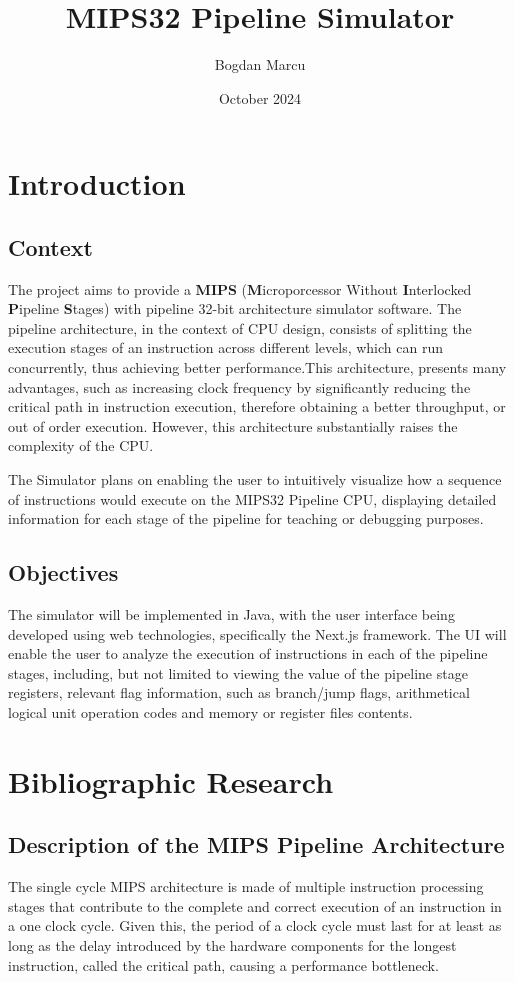 \documentclass{article}
\title{MIPS32 Pipeline Simulator}
\author{Bogdan Marcu}
\date{October 2024}
\begin{document}
\maketitle

\newpage

\tableofcontents

\newpage
\section{Introduction}
\subsection{Context}
The project aims to provide a \textbf{MIPS} (\textbf{M}icroporcessor Without \textbf{I}nterlocked \textbf{P}ipeline \textbf{S}tages) with pipeline 32-bit architecture simulator software. The pipeline architecture, in the context of CPU design, consists of splitting the execution stages of an instruction across different levels, which can run concurrently, thus achieving better performance.This architecture, presents many advantages, such as increasing clock frequency by significantly reducing the critical path in instruction execution, therefore obtaining a better throughput, or out of order execution. However, this architecture substantially raises the complexity of the CPU. 

The Simulator plans on enabling the user to intuitively visualize how a sequence of instructions would execute on the MIPS32 Pipeline CPU, displaying detailed information for each stage of the pipeline for teaching or debugging purposes.
\subsection{Objectives}
The simulator will be implemented in Java, with the user interface being developed using web technologies, specifically the Next.js framework. The UI will enable the user to analyze the execution of instructions in each of the pipeline stages, including, but not limited to viewing the value of the pipeline stage registers, relevant flag information, such as branch/jump flags, arithmetical logical unit operation codes and memory or register files contents.   
\newpage
\section{Bibliographic Research}

\subsection{Description of the MIPS Pipeline Architecture}
The single cycle MIPS architecture is made of multiple instruction processing stages that contribute to the complete and correct execution of an instruction in a one clock cycle. Given this, the period of a clock cycle must last for at least as long as the delay introduced by the hardware components for the longest instruction, called the critical path, causing a performance bottleneck.
\end{document}
